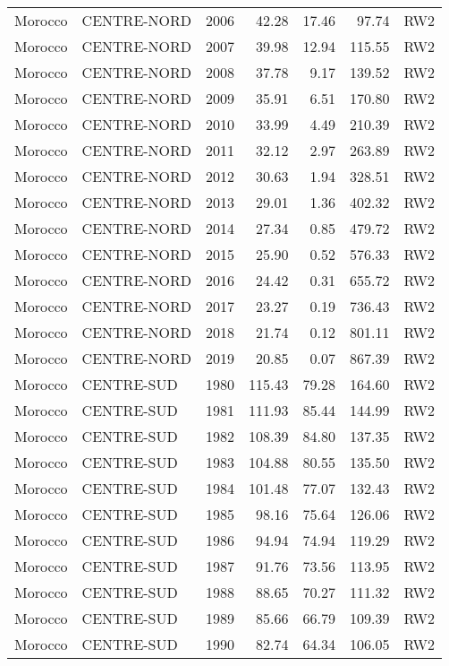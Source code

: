 \begin{longtable}{lllrrrl}
  Morocco & CENTRE-NORD & 2006 & 42.28 & 17.46 & 97.74 & RW2 \\ 
  Morocco & CENTRE-NORD & 2007 & 39.98 & 12.94 & 115.55 & RW2 \\ 
  Morocco & CENTRE-NORD & 2008 & 37.78 & 9.17 & 139.52 & RW2 \\ 
  Morocco & CENTRE-NORD & 2009 & 35.91 & 6.51 & 170.80 & RW2 \\ 
  Morocco & CENTRE-NORD & 2010 & 33.99 & 4.49 & 210.39 & RW2 \\ 
  Morocco & CENTRE-NORD & 2011 & 32.12 & 2.97 & 263.89 & RW2 \\ 
  Morocco & CENTRE-NORD & 2012 & 30.63 & 1.94 & 328.51 & RW2 \\ 
  Morocco & CENTRE-NORD & 2013 & 29.01 & 1.36 & 402.32 & RW2 \\ 
  Morocco & CENTRE-NORD & 2014 & 27.34 & 0.85 & 479.72 & RW2 \\ 
  Morocco & CENTRE-NORD & 2015 & 25.90 & 0.52 & 576.33 & RW2 \\ 
  Morocco & CENTRE-NORD & 2016 & 24.42 & 0.31 & 655.72 & RW2 \\ 
  Morocco & CENTRE-NORD & 2017 & 23.27 & 0.19 & 736.43 & RW2 \\ 
  Morocco & CENTRE-NORD & 2018 & 21.74 & 0.12 & 801.11 & RW2 \\ 
  Morocco & CENTRE-NORD & 2019 & 20.85 & 0.07 & 867.39 & RW2 \\ 
  Morocco & CENTRE-SUD & 1980 & 115.43 & 79.28 & 164.60 & RW2 \\ 
  Morocco & CENTRE-SUD & 1981 & 111.93 & 85.44 & 144.99 & RW2 \\ 
  Morocco & CENTRE-SUD & 1982 & 108.39 & 84.80 & 137.35 & RW2 \\ 
  Morocco & CENTRE-SUD & 1983 & 104.88 & 80.55 & 135.50 & RW2 \\ 
  Morocco & CENTRE-SUD & 1984 & 101.48 & 77.07 & 132.43 & RW2 \\ 
  Morocco & CENTRE-SUD & 1985 & 98.16 & 75.64 & 126.06 & RW2 \\ 
  Morocco & CENTRE-SUD & 1986 & 94.94 & 74.94 & 119.29 & RW2 \\ 
  Morocco & CENTRE-SUD & 1987 & 91.76 & 73.56 & 113.95 & RW2 \\ 
  Morocco & CENTRE-SUD & 1988 & 88.65 & 70.27 & 111.32 & RW2 \\ 
  Morocco & CENTRE-SUD & 1989 & 85.66 & 66.79 & 109.39 & RW2 \\ 
  Morocco & CENTRE-SUD & 1990 & 82.74 & 64.34 & 106.05 & RW2 \\ 

\end{longtable}
